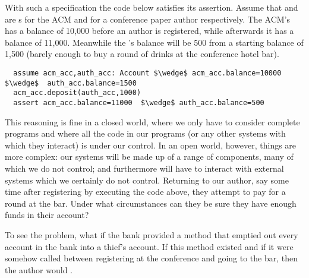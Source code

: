 
With such a specification %
the code below  satisfies its assertion. Assume that 
 and  are s for the ACM and
for a conference paper author respectively. The ACM's 
has a balance of 10,000 before an author is 
registered, while afterwards it has a balance of 11,000. Meanwhile the
's balance  will be 500 from a starting balance of 1,500
(barely enough to buy a round of drinks at the conference hotel bar).

\begin{lstlisting}
  assume acm_acc,auth_acc: Account $\wedge$ acm_acc.balance=10000 $\wedge$  auth_acc.balance=1500
  acm_acc.deposit(auth_acc,1000)
  assert acm_acc.balance=11000  $\wedge$ auth_acc.balance=500
\end{lstlisting}

\vspace{-.2in}

This reasoning is fine in a closed world, where we only have to
consider complete programs and where all the code in our programs (or any
other systems with which they interact) is under our control.   
In an
open world, however, things are more complex: our systems will be made
up of a range of 
components, many of which we do not control; and
furthermore will have to interact with external systems which we
certainly do not control.  Returning to our author, say some time
after registering by executing the  code above, they
attempt to pay for a round at the bar.  Under what circumstances can
they be sure they have enough funds in their account?

To see the problem, what if the bank provided a  method that 
 emptied out every account in the bank into a thief's account.
If this method existed and
if it were somehow called between registering at the conference and
going to the bar, then the author 
would .
%

